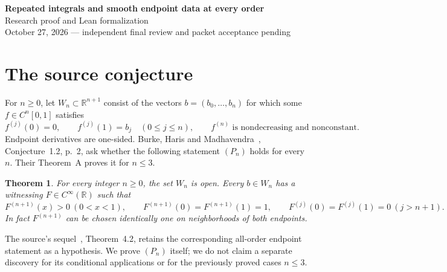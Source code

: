 \documentclass[11pt]{article}
\newtheorem{theorem}{Theorem}
\newcommand{\R}{\mathbb R}
\begin{document}
\begin{center}
{\Large\bfseries Repeated integrals and smooth endpoint data at every order}\\[.5em]
Research proof and Lean formalization\\
October 27, 2026 --- independent final review and packet acceptance pending
\end{center}
\begin{abstract}
We prove the all-order endpoint-data conjecture of Burke, Haris and
Madhavendra. The Stieltjes measure of a continuous nonconstant increasing
highest derivative is atomless and nonzero. Its finitely many moments have
a strictly positive smooth representing density equal to one near both
endpoints. A direct separation argument proves this representation, and
repeated integration supplies the required endpoint derivatives. The
admissible endpoint-data set is an invertible linear image of an open
convex smooth-moment image. The full all-order source statement is
formally verified in Lean, including the concrete convexity and openness
proofs and every source, measure, kernel and endpoint bridge.
\end{abstract}

\section{The source conjecture}
For $n\ge0$, let $W_n\subset\R^{n+1}$ consist of the vectors
$b=(b_0,\ldots,b_n)$ for which some $f\in C^n[0,1]$ satisfies
\begin{equation}\label{W}
 f^{(j)}(0)=0,\qquad f^{(j)}(1)=b_j\quad(0\le j\le n),
 \qquad f^{(n)}\text{ is nondecreasing and nonconstant}.
\end{equation}
Endpoint derivatives are one-sided. Burke, Haris and
Madhavendra~\cite{BHM}, Conjecture~1.2, p.~2, ask whether the following
statement $(P_n)$ holds for every $n$. Their Theorem~A proves it for $n\le3$.

\begin{theorem}\label{main}
For every integer $n\ge0$, the set $W_n$ is open. Every $b\in W_n$ has
a witnessing $F\in C^\infty(\R)$ such that
\[
 F^{(n+1)}(x)>0\ (0<x<1),\qquad
 F^{(n+1)}(0)=F^{(n+1)}(1)=1,
 \qquad F^{(j)}(0)=F^{(j)}(1)=0\ (j>n+1).
\]
In fact $F^{(n+1)}$ can be chosen identically one on neighborhoods of
both endpoints.
\end{theorem}

The source's sequel~\cite{Burke}, Theorem~4.2, retains the corresponding
all-order endpoint statement as a hypothesis. We prove $(P_n)$ itself;
we do not claim a separate discovery for its conditional applications or
for the previously proved cases $n\le3$.
\end{document}
